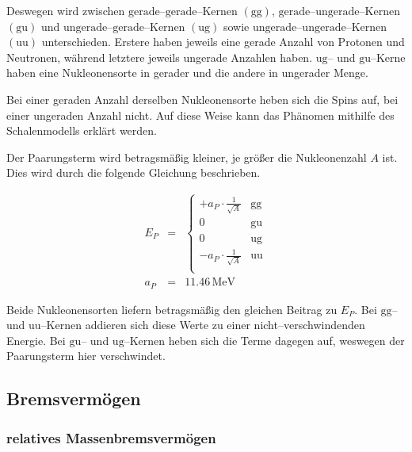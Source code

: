 \documentclass[12pt,a4paper]{scrartcl}
\numberwithin{equation}{section} %
\begin{document}
Deswegen wird zwischen $\mathrm{gerade}$--$\mathrm{gerade}$--Kernen $(\mathrm{gg})$, $\mathrm{gerade}$--$\mathrm{ungerade}$--Kernen $(\mathrm{gu})$ und $\mathrm{ungerade}$--$\mathrm{gerade}$--Kernen $(\mathrm{ug})$ sowie $\mathrm{ungerade}$--$\mathrm{ungerade}$--Kernen $(\mathrm{uu})$ unterschieden. Erstere haben jeweils eine gerade Anzahl von Protonen und Neutronen, während letztere jeweils ungerade Anzahlen haben. $\mathrm{ug}$-- und $\mathrm{gu}$--Kerne haben eine Nukleonensorte in gerader und die andere in ungerader Menge.

Bei einer geraden Anzahl derselben Nukleonensorte heben sich die Spins auf, bei einer ungeraden Anzahl nicht. Auf diese Weise kann das Phänomen mithilfe des Schalenmodells erklärt werden.

Der Paarungsterm wird betragsmäßig kleiner, je größer die Nukleonenzahl $A$ ist. Dies wird durch die folgende Gleichung beschrieben.

\begin{eqnarray}
    E_P &=&
        \begin{cases}
            + a_P\cdot \frac{1}{\sqrt{A}} & \text{gg} \\
            0 & \text{gu} \\
            0 & \text{ug} \\
            - a_P\cdot \frac{1}{\sqrt{A}} & \text{uu} \\
        \end{cases}
        \label{Paarungsterm} \\
    a_P &=& 11.46\mathrm{\,MeV}
\end{eqnarray}

\noindent
Beide Nukleonensorten liefern betragsmäßig den gleichen Beitrag zu $E_P$. Bei $\mathrm{gg}$-- und $\mathrm{uu}$--Kernen addieren sich diese Werte zu einer nicht--verschwindenden Energie. Bei $\mathrm{gu}$-- und $\mathrm{ug}$--Kernen heben sich die Terme dagegen auf, weswegen der Paarungsterm hier verschwindet.

\hypertarget{bremsvermuxf6gen}{%
\subsection{Bremsvermögen}\label{bremsvermuxf6gen}}

\hypertarget{relatives-massenbremsvermuxf6gen}{%
	\subsubsection{relatives
		Massenbremsvermögen}\label{relatives-massenbremsvermuxf6gen}}
\end{document}
